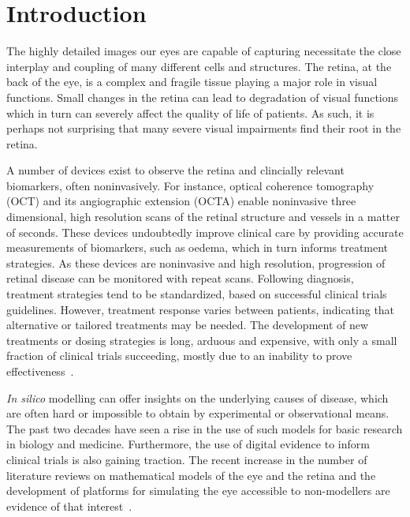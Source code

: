 \documentclass{article}
\begin{document}
\section{Introduction}\label{sec:Introduction}
  
The highly detailed images our eyes are capable of capturing necessitate the close interplay and coupling of many different cells and structures.
The retina, at the back of the eye, is a complex and fragile tissue playing a major role in visual functions.
Small changes in the retina can lead to degradation of visual functions which in turn can severely affect the quality of life of patients.
As such, it is perhaps not surprising that many severe visual impairments find their root in the retina.

A number of devices exist to observe the retina and clincially relevant biomarkers, often noninvasively.
For instance, optical coherence tomography (OCT) and its angiographic extension (OCTA) enable noninvasive three dimensional, high resolution scans of the retinal structure and vessels in a matter of seconds.
These devices undoubtedly improve clinical care by providing accurate measurements of biomarkers, such as oedema, which in turn informs treatment strategies.
As these devices are noninvasive and high resolution, progression of retinal disease can be monitored with repeat scans.
Following diagnosis, treatment strategies tend to be standardized, based on successful clinical trials guidelines.
However, treatment response varies between patients, indicating that alternative or tailored treatments may be needed.
The development of new treatments or dosing strategies is long, arduous and expensive, with only a small fraction of clinical trials succeeding, mostly due to an inability to prove effectiveness~\cite{Fogel_2018}.

\textit{In silico} modelling can offer insights on the underlying causes of disease, which are often hard or impossible to obtain by experimental or observational means.
The past two decades have seen a rise in the use of such models for basic research in biology and medicine.
Furthermore, the use of digital evidence to inform clinical trials is also gaining traction. 
The recent increase in the number of literature reviews on mathematical models of the eye and the retina and the development of platforms for simulating the eye accessible to non-modellers are evidence of that interest~\cite{Arciero_2019,Arciero_2017,Bhandari_2021,Harris_2013,Prudhomme_2021,Roberts_2016,Sala_2018}.
\end{document}
